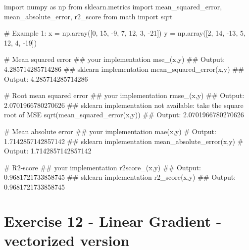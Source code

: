 \documentclass[]{article}
\newenvironment{Shaded}{\begin{snugshade}}{\end{snugshade}}
\newcommand{\CommentTok}[1]{\textcolor[rgb]{0.48,0.49,0.49}{#1}}
\newcommand{\DecValTok}[1]{\textcolor[rgb]{0.96,0.45,0.00}{#1}}
\newcommand{\FloatTok}[1]{\textcolor[rgb]{0.96,0.45,0.00}{#1}}
\newcommand{\ImportTok}[1]{\textcolor[rgb]{0.15,0.68,0.38}{#1}}
\newcommand{\NormalTok}[1]{\textcolor[rgb]{0.81,0.81,0.76}{#1}}
\newcommand{\OperatorTok}[1]{\textcolor[rgb]{0.81,0.81,0.76}{#1}}
\begin{document}
\begin{Shaded}
\begin{Highlighting}[]
\ImportTok{import}\NormalTok{ numpy }\ImportTok{as}\NormalTok{ np}
\ImportTok{from}\NormalTok{ sklearn.metrics }\ImportTok{import}\NormalTok{ mean_squared_error, mean_absolute_error, r2_score}
\ImportTok{from}\NormalTok{ math }\ImportTok{import}\NormalTok{ sqrt}

\CommentTok{# Example 1:}
\NormalTok{x }\OperatorTok{=}\NormalTok{ np.array([}\DecValTok{0}\NormalTok{, }\DecValTok{15}\NormalTok{, }\DecValTok{-9}\NormalTok{, }\DecValTok{7}\NormalTok{, }\DecValTok{12}\NormalTok{, }\DecValTok{3}\NormalTok{, }\DecValTok{-21}\NormalTok{])}
\NormalTok{y }\OperatorTok{=}\NormalTok{ np.array([}\DecValTok{2}\NormalTok{, }\DecValTok{14}\NormalTok{, }\DecValTok{-13}\NormalTok{, }\DecValTok{5}\NormalTok{, }\DecValTok{12}\NormalTok{, }\DecValTok{4}\NormalTok{, }\DecValTok{-19}\NormalTok{])}

\CommentTok{# Mean squared error}
\CommentTok{## your implementation}
\NormalTok{mse_(x,y)}
\CommentTok{## Output:}
\FloatTok{4.285714285714286}
\CommentTok{## sklearn implementation}
\NormalTok{mean_squared_error(x,y)}
\CommentTok{## Output:}
\FloatTok{4.285714285714286}

\CommentTok{# Root mean squared error}
\CommentTok{## your implementation}
\NormalTok{rmse_(x,y)}
\CommentTok{## Output:}
\FloatTok{2.0701966780270626}
\CommentTok{## sklearn implementation not available: take the square root of MSE}
\NormalTok{sqrt(mean_squared_error(x,y))}
\CommentTok{## Output:}
\FloatTok{2.0701966780270626}

\CommentTok{# Mean absolute error}
\CommentTok{## your implementation}
\NormalTok{mae(x,y)}
\CommentTok{# Output:}
\FloatTok{1.7142857142857142}
\CommentTok{## sklearn implementation}
\NormalTok{mean_absolute_error(x,y)}
\CommentTok{# Output:}
\FloatTok{1.7142857142857142}

\CommentTok{# R2-score}
\CommentTok{## your implementation}
\NormalTok{r2score_(x,y)}
\CommentTok{## Output:}
\FloatTok{0.9681721733858745}
\CommentTok{## sklearn implementation}
\NormalTok{r2_score(x,y)}
\CommentTok{## Output:}
\FloatTok{0.9681721733858745}
\end{Highlighting}
\end{Shaded}

\clearpage

\hypertarget{exercise-12---linear-gradient---vectorized-version}{%
\section{Exercise 12 - Linear Gradient - vectorized
version}\label{exercise-12---linear-gradient---vectorized-version}}
\end{document}
